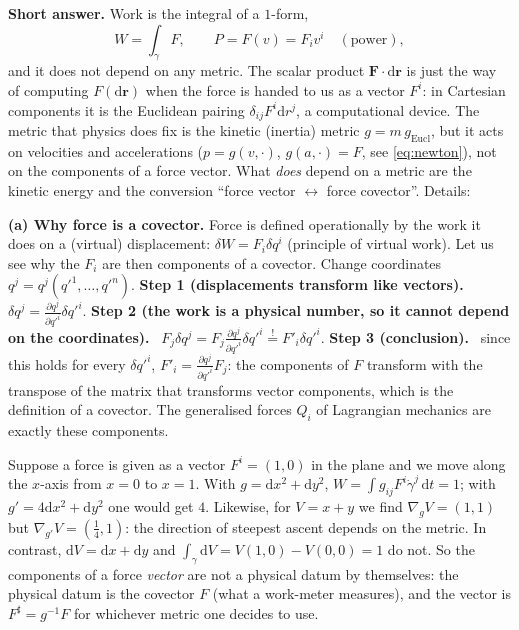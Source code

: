 \documentclass[11pt,a4paper]{article}
\numberwithin{equation}{section}
\theoremstyle{definition}
\theoremstyle{plain}
\newcommand{\Step}[2]{\textbf{Step #1 (#2).}\ }
\newcommand{\dd}{\mathrm{d}}
\begin{document}
\textbf{Short answer.} Work is the integral of a $1$-form,
\begin{equation}\label{eq:work}
W=\int_\gamma F,\qquad P=F(v)=F_iv^i\quad(\text{power}),
\end{equation}
and it does not depend on any metric. The scalar product $\mathbf F\cdot\dd\mathbf r$ is just the way of computing $F(\dd\mathbf r)$ when the force is handed to us as a vector $F^i$: in Cartesian components it is the Euclidean pairing $\delta_{ij}F^i\dd r^j$, a computational device.
The metric that physics does fix is the kinetic (inertia) metric $g=m\,g_{\mathrm{Eucl}}$, but it acts on velocities and accelerations ($p=g(v,\cdot)$, $g(a,\cdot)=F$, see \eqref{eq:newton}), not on the components of a force vector. What \emph{does} depend on a metric are the kinetic energy and the conversion ``force vector $\leftrightarrow$ force covector''. Details:

\textbf{(a) Why force is a covector.} Force is defined operationally by the work it does on a (virtual) displacement: $\delta W=F_i\delta q^i$ (principle of virtual work). Let us see why the $F_i$ are then components of a covector. Change coordinates $q^j=q^j(q'^1,\dots,q'^n)$.
\Step{1}{displacements transform like vectors} $\delta q^j=\frac{\partial q^j}{\partial q'^i}\delta q'^i$.
\Step{2}{the work is a physical number, so it cannot depend on the coordinates} $F_j\delta q^j=F_j\frac{\partial q^j}{\partial q'^i}\delta q'^i\overset!=F'_i\delta q'^i$.
\Step{3}{conclusion} since this holds for every $\delta q'^i$, $F'_i=\frac{\partial q^j}{\partial q'^i}F_j$: the components of $F$ transform with the transpose of the matrix that transforms vector components, which is the definition of a covector. The generalised forces $Q_i$ of Lagrangian mechanics are exactly these components.

\begin{example}\label{ex:twometrics}
Suppose a force is given as a vector $F^i=(1,0)$ in the plane and we move along the $x$-axis from $x=0$ to $x=1$. With $g=\dd x^2+\dd y^2$, $W=\int g_{ij}F^i\dot\gamma^j\,\dd t=1$; with $g'=4\dd x^2+\dd y^2$ one would get $4$.
Likewise, for $V=x+y$ we find $\nabla_gV=(1,1)$ but $\nabla_{g'}V=(\frac14,1)$: the direction of steepest ascent depends on the metric. In contrast, $\dd V=\dd x+\dd y$ and $\int_\gamma\dd V=V(1,0)-V(0,0)=1$ do not.
So the components of a force \emph{vector} are not a physical datum by themselves: the physical datum is the covector $F$ (what a work-meter measures), and the vector is $F^\sharp=g^{-1}F$ for whichever metric one decides to use.
\end{example}
\end{document}
